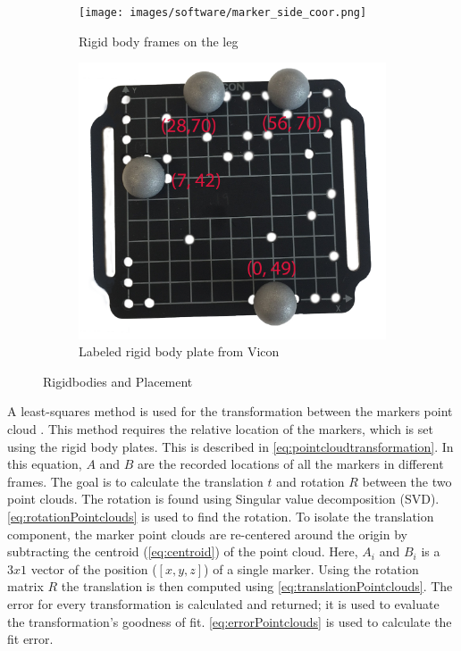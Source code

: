 \begin{figure}
\centering 
\begin{subfigure}{0.4\linewidth} 
  \centering 
  \texttt{[image: images/software/marker\_side\_coor.png]} 
  \caption[RigidBody Frames]{Rigid body frames on the leg} 
  \label{fig:markers_side} 
\end{subfigure} 
%
\begin{subfigure}{0.4\linewidth} 
  \centering 
    \centering
    \includegraphics[scale=0.11]{images/software/rigidbody_label.png} 
    \caption{Labeled rigid body plate from Vicon}
    \label{fig:rigidbody}
\end{subfigure} 
\caption[Rigidbodies and Placement]{Rigidbodies and Placement} 
\label{fig:markers} 

\end{figure} 

A least-squares method is used for the transformation between the markers point cloud \cite{arun1987least}. This method requires the relative location of the markers, which is set using the rigid body plates. This is described in \autoref{eq:pointcloudtransformation}. In this equation, $A$ and $B$ are the recorded locations of all the markers in different frames. The goal is to calculate the translation $t$ and rotation $R$ between the two point clouds. The rotation is found using Singular value decomposition (SVD). \autoref{eq:rotationPointclouds} is used to find the rotation. To isolate the translation component, the marker point clouds are re-centered around the origin by subtracting the centroid (\autoref{eq:centroid}) of the point cloud. Here, $A_i$ and $B_i$ is a $3x1$ vector of the position ($[x,y,z]$) of a single marker. Using the rotation matrix $R$ the translation is then computed using  \autoref{eq:translationPointclouds}.  The error for every transformation is calculated and returned; it is used to evaluate the transformation's goodness of fit. \autoref{eq:errorPointclouds} is used to calculate the fit error.   


